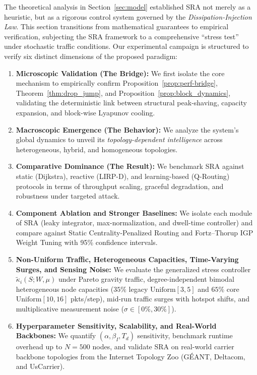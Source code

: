 \documentclass[journal]{IEEEtran}
\theoremstyle{plain}
\theoremstyle{definition}
\newcommand{\rev}[1]{{\color{blue}#1}}
\begin{document}
The theoretical analysis in Section~\ref{sec:model} established SRA not merely as a heuristic, but as a rigorous control system governed by the \textit{Dissipation-Injection Law}. 
This section transitions from mathematical guarantees to empirical verification, subjecting the SRA framework to a comprehensive ``stress test'' under stochastic traffic conditions.
Our experimental campaign is structured to verify \rev{six} distinct dimensions of the proposed paradigm:
\begin{enumerate}
    \item \textbf{Microscopic Validation (The Bridge):} We first isolate the core mechanism to empirically confirm Proposition~\ref{prop:perf-bridge}, Theorem~\ref{thm:drop_jump}, and Proposition~\ref{prop:block_dynamics}, validating the deterministic link between structural peak-shaving, capacity expansion, and block-wise Lyapunov cooling.
    \item \textbf{Macroscopic Emergence (The Behavior):} We analyze the system's global dynamics to unveil its \textit{topology-dependent intelligence} across heterogeneous, hybrid, and homogeneous topologies.
    \item \textbf{Comparative Dominance (The Result):} We benchmark SRA against static (Dijkstra), reactive (LIRP-D), and learning-based (Q-Routing) protocols in terms of throughput scaling, graceful degradation, and robustness under targeted attack.
    \item \rev{\textbf{Component Ablation and Stronger Baselines:} We isolate each module of SRA (leaky integrator, max-normalization, and dwell-time controller) and compare against Static Centrality-Penalized Routing and Fortz--Thorup IGP Weight Tuning \cite{Fortz2000OSPF} with 95\% confidence intervals.}
    \item \rev{\textbf{Non-Uniform Traffic, Heterogeneous Capacities, Time-Varying Surges, and Sensing Noise:} We evaluate the generalized stress controller $\widetilde{\kappa}_i(S;W,\mu)$ under Pareto gravity traffic, degree-independent bimodal heterogeneous node capacities ($35\%$ legacy $\mathrm{Uniform}[3, 5]$ and $65\%$ core $\mathrm{Uniform}[10, 16]$ pkts/step), mid-run traffic surges with hotspot shifts, and multiplicative measurement noise ($\sigma \in [0\%, 30\%]$).}
    \item \rev{\textbf{Hyperparameter Sensitivity, Scalability, and Real-World Backbones:} We quantify $(\alpha, \beta_I, T_d)$ sensitivity, benchmark runtime overhead up to $N=500$ nodes, and validate SRA on real-world carrier backbone topologies from the Internet Topology Zoo \cite{Knight2011TopologyZoo} (G\'EANT, Deltacom, and UsCarrier).}
\end{enumerate}
\end{document}

